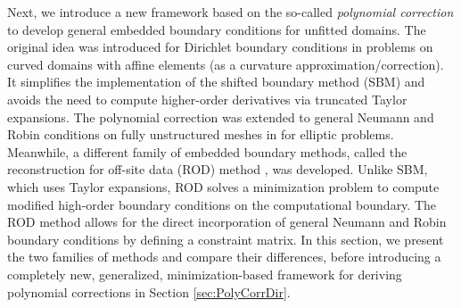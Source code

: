 \documentclass{article}
\begin{document}
Next, we introduce a new framework based on the so-called {\it polynomial correction} to develop general embedded boundary conditions for unfitted domains. The original idea \cite{ciallella2023shifted} was introduced for Dirichlet boundary conditions in problems on curved domains with affine elements (as a curvature approximation/correction). It simplifies the implementation of the shifted boundary method (SBM) \cite{main2018shifted,atallah2022high} and avoids the need to compute higher-order derivatives via truncated Taylor expansions. The polynomial correction was extended to general Neumann and Robin conditions on fully unstructured meshes in \cite{visbech2025spectral} for elliptic problems. Meanwhile, a different family of embedded boundary methods, called the reconstruction for off-site data (ROD) method \cite{costa2018very,costa2019very}, was developed. Unlike SBM, which uses Taylor expansions, ROD solves a minimization problem to compute modified high-order boundary conditions on the computational boundary. The ROD method allows for the direct incorporation of general Neumann and Robin boundary conditions by defining a constraint matrix. In this section, we present the two families of methods and compare their differences, before introducing a completely new, generalized, minimization-based framework for deriving polynomial corrections in Section \ref{sec:PolyCorrDir}.
\end{document}

